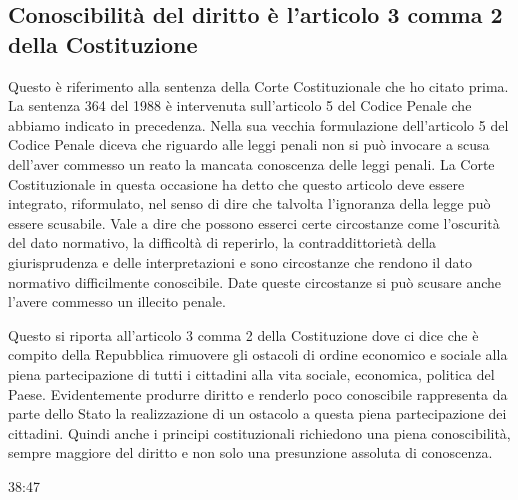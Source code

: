 \subsection{Conoscibilità del diritto è l'articolo 3 comma 2 della Costituzione}
Questo è riferimento alla sentenza della Corte Costituzionale che ho citato prima. La sentenza 364 del 1988 è intervenuta sull'articolo 5 del Codice Penale che abbiamo indicato in precedenza. Nella sua vecchia formulazione dell'articolo 5 del Codice Penale diceva che riguardo alle leggi penali non si può invocare a scusa dell'aver commesso un reato la mancata conoscenza delle leggi penali. La Corte Costituzionale in questa occasione ha detto che questo articolo deve essere integrato, riformulato, nel senso di dire che talvolta l'ignoranza della legge può essere scusabile. Vale a dire che possono esserci certe circostanze come l'oscurità del dato normativo, la difficoltà di reperirlo, la contraddittorietà della giurisprudenza e delle interpretazioni e sono circostanze che rendono il dato normativo difficilmente conoscibile. Date queste circostanze si può scusare anche l'avere commesso un illecito penale.\par
Questo si riporta all'articolo 3 comma 2 della Costituzione dove ci dice che è compito della Repubblica rimuovere gli ostacoli di ordine economico e sociale alla piena partecipazione di tutti i cittadini alla vita sociale, economica, politica del Paese. Evidentemente produrre diritto e renderlo poco conoscibile rappresenta da parte dello Stato la realizzazione di un ostacolo a questa piena partecipazione dei cittadini. Quindi anche i principi costituzionali richiedono una piena conoscibilità, sempre maggiore del diritto e non solo una presunzione assoluta di conoscenza.\par  38:47
